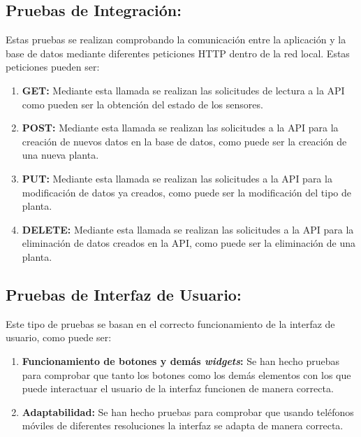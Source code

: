 \subsection{Pruebas de Integración:} Estas pruebas se realizan comprobando la comunicación entre la aplicación y la base de datos mediante diferentes peticiones HTTP dentro de la red local. Estas peticiones pueden ser:
    \begin{enumerate}
        \item \textbf{GET:} Mediante esta llamada se realizan las solicitudes de lectura a la API como pueden ser la obtención del estado de los sensores.
        \item \textbf{POST:} Mediante esta llamada se realizan las solicitudes a la API para la creación de nuevos datos en la base de datos, como puede ser la creación de una nueva planta.
        \item \textbf{PUT:} Mediante esta llamada se realizan las solicitudes a la API para la modificación de datos ya creados, como puede ser la modificación del tipo de planta.
        \item \textbf{DELETE:} Mediante esta llamada se realizan las solicitudes a la API para la eliminación de datos creados en la API, como puede ser la eliminación de una planta.
    \end{enumerate}
\subsection{Pruebas de Interfaz de Usuario:} Este tipo de pruebas se basan en el correcto funcionamiento de la interfaz de usuario, como puede ser:
    \begin{enumerate}
        \item \textbf{Funcionamiento de botones y demás \textit{widgets}:} Se han hecho pruebas para comprobar que tanto los botones como los demás elementos con los que puede interactuar el usuario de la interfaz funcionen de manera correcta.
        \item \textbf{Adaptabilidad:} Se han hecho pruebas para comprobar que usando teléfonos móviles de diferentes resoluciones la interfaz se adapta de manera correcta.
    \end{enumerate}
